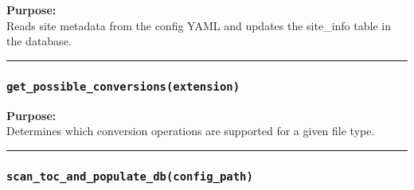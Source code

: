 \textbf{Purpose:}\\
Reads site metadata from the config YAML and updates the site\_info
table in the database.

\begin{center}\rule{0.5\linewidth}{0.5pt}\end{center}

\subsubsection{\texorpdfstring{\texttt{get\_possible\_conversions(extension)}}{get\_possible\_conversions(extension)}}\label{get_possible_conversionsextension}

\begin{Shaded}
\begin{Highlighting}[]
\end{Highlighting}
\end{Shaded}

\textbf{Purpose:}\\
Determines which conversion operations are supported for a given file
type.

\begin{center}\rule{0.5\linewidth}{0.5pt}\end{center}

\subsubsection{\texorpdfstring{\texttt{scan\_toc\_and\_populate\_db(config\_path)}}{scan\_toc\_and\_populate\_db(config\_path)}}\label{scan_toc_and_populate_dbconfig_path}

\begin{Shaded}
\begin{Highlighting}[]
\end{Highlighting}
\end{Shaded}

